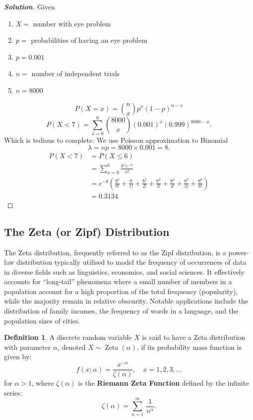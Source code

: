 \documentclass[12pt,a4paper]{report}
\theoremstyle{definition}
\newtheorem{definition}[thm]{Definition}
\theoremstyle{plain}
\theoremstyle{definition}
\begin{document}
\begin{proof}[\textbf{\textit{Solution}}]
Given 
\begin{enumerate}
\item[ ] $X = $ number with eye problem
\item[ ] $p = $ probabilities of having an eye problem
\item[ ] $p = 0.001$
\item[ ] $n = $ number of independent trials
\item[ ] $n = 8000$
\end{enumerate}
\[P(X=x) = \binom{n}{x} p^x(1-p)^{n-x}\]
\[
P(X<7) = \sum^6_{x=0}\binom{8000}{x}(0.001)^x(0.999)^{8000-x}.\]
Which is tedious to complete. We use Poisson approximation to Binomial
\[\lambda = np =8000\times 0.001 = 8.\]
\begin{align*}
P(X<7) & = P(X\leq 6)\\
& = \sum^6_{x=0}\frac{8^xe^{-8}}{x!}\\
&= e^{-8}\left(\frac{8^0}{0!}+\frac{8}{1!}+\frac{8^2}{2!}+\frac{8^3}{3!}+\frac{8^4}{4!}+\frac{8^5}{5!}+\frac{8^6}{6!}\right)\\
&=0.3134
\end{align*}
\end{proof}












\subsection{The Zeta (or Zipf) Distribution}
\vspace{-10pt}
The Zeta distribution, frequently referred to as the Zipf distribution, is a power-law distribution typically utilised to model the frequency of occurrences of data in diverse fields such as linguistics, economics, and social sciences. It effectively accounts for ``long-tail'' phenomena where a small number of members in a population account for a high proportion of the total frequency (popularity), while the majority remain in relative obscurity. Notable applications include the distribution of family incomes, the frequency of words in a language, and the population sizes of cities.


\begin{definition}
A discrete random variable $X$ is said to have a Zeta distribution with parameter $\alpha$, denoted $X \sim \operatorname{Zeta}(\alpha)$, if its probability mass function is given by:\[f(x; \alpha) = \frac{x^{-\alpha}}{\zeta(\alpha)}, \quad x = 1, 2, 3, \dots\]for $\alpha > 1$, where $\zeta(\alpha)$ is the \textbf{Riemann Zeta Function} defined by the infinite series:\[\zeta(\alpha) = \sum_{n=1}^{\infty}\,\frac{1}{n^{\alpha}}.\]
\end{definition}
\end{document}
